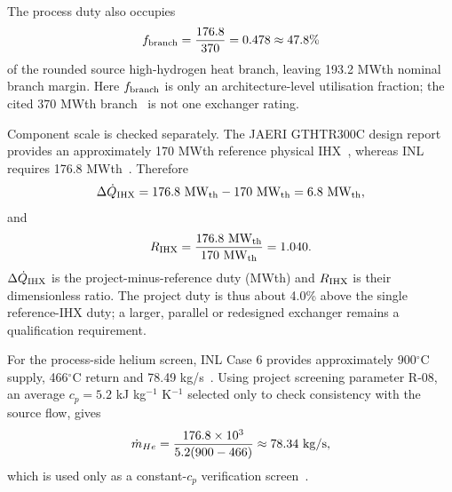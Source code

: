The process duty also occupies
\begin{equation}\label{eq:branch-utilisation}
f_{\rm branch}=\frac{176.8}{370}=0.478\approx47.8\%
\end{equation}
of the rounded source high-hydrogen heat branch, leaving 193.2 MWth nominal branch margin. Here $f_{\rm branch}$ is only an architecture-level utilisation fraction; the cited 370 MWth branch~\cite{nishihara2007potential} is not one exchanger rating.

Component scale is checked separately. The JAERI GTHTR300C design report provides an approximately 170 MWth reference physical IHX~\cite{jaeri2004gthtr300c}, whereas INL requires 176.8 MWth~\cite{inltev961}. Therefore
\begin{equation}\label{eq:ihx-duty-gap}
\Delta \dot Q_{\rm IHX}=176.8~\mathrm{MW_{th}}-170~\mathrm{MW_{th}}=6.8~\mathrm{MW_{th}},
\end{equation}
and
\begin{equation}\label{eq:ihx-duty-ratio}
R_{\rm IHX}=\frac{176.8~\mathrm{MW_{th}}}{170~\mathrm{MW_{th}}}=1.040.
\end{equation}
$\Delta\dot Q_{\rm IHX}$ is the project-minus-reference duty (MWth) and $R_{\rm IHX}$ is their dimensionless ratio. The project duty is thus about 4.0\% above the single reference-IHX duty; a larger, parallel or redesigned exchanger remains a qualification requirement.

For the process-side helium screen, INL Case 6 provides approximately 900$^\circ$C supply, 466$^\circ$C return and 78.49 kg/s~\cite{inltev961}. Using project screening parameter R-08, an average $c_p=5.2$ kJ kg$^{-1}$ K$^{-1}$ selected only to check consistency with the source flow, gives
\begin{equation}\label{eq:helium-flow-check}
\dot m_{He}=\frac{176.8\times10^3}{5.2(900-466)}\approx78.34\ {\rm kg/s},
\end{equation}
which is used only as a constant-$c_p$ verification screen~\cite{inltev961}.




